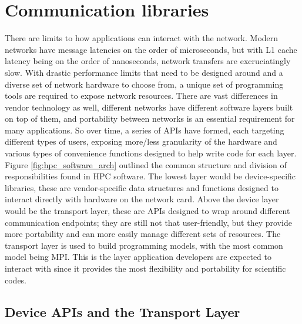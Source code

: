 \section{Communication libraries} 

There are limits to how applications can interact with the network.
Modern networks have message latencies on the order of microseconds, but with L1 cache latency being on the order of nanoseconds, network transfers are excruciatingly slow.
With drastic performance limits that need to be designed around and a diverse set of network hardware to choose from, a unique set of programming tools are required to expose network resources. 
There are vast differences in vendor technology as well, different networks have different software layers built on top of them, and portability between networks is an essential requirement for many applications. 
So over time, a series of \gls{API}s have formed, each targeting different types of users, exposing more/less granularity of the hardware and various types of convenience functions designed to help write code for each layer.
Figure \ref{fig:hpc_software_arch} outlined the common structure and division of responsibilities found in HPC software.
The lowest layer would be device-specific libraries, these are vendor-specific data structures and functions designed to interact directly with hardware on the network card.
Above the device layer would be the transport layer, these are \gls{API}s designed to wrap around different communication endpoints; they are still not that user-friendly, but they provide more portability and can more easily manage different sets of resources.
The transport layer is used to build programming models, with the most common model being \gls{MPI}.
This is the layer application developers are expected to interact with since it provides the most flexibility and portability for scientific codes.

\subsection{Device APIs and the Transport Layer}

